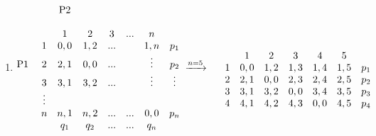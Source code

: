         \begin{enumerate}
            \item \phantom{text}
            \begin{latin}
                \begin{center}
                    \begin{equation*}
                                \begin{matrix}
                                      & & \text{P2}                  \\ \\ 
                                      & & 1 & 2 & 3 & ... & n            \\
                                    & 1 & 0,0 & 1,2 & ... & & 1,n  & p_1         \\
                                    \text{P1} \hspace{1mm}& 2 & 2,1 & 0,0 & ... &  & \vdots & p_2   \\
                                    & 3 & 3,1 & 3,2 & ... & & \vdots & \vdots\\
                                    & \vdots \\
                                    & n & n,1 & n,2 & ... & ... & 0,0  & p_n \\
                                    &  & q_1 & q_2 & ... & ... & q_n 
                                    \end{matrix}
                                    \hspace{1mm}
                                     \xrightarrow{n = 5} 
                                    \hspace{1mm}
                                     \begin{matrix}
                                        & & \text{}                  \\ \\ 
                                        & & 1 & 2 & 3 & 4 & 5            \\
                                      & 1 & 0,0 & 1,2 & 1,3 & 1,4 & 1,5  & p_1         \\
                                      \text{} \hspace{1mm}& 2 & 2,1 & 0,0 & 2,3 & 2,4 & 2,5 & p_2   \\
                                      & 3 & 3,1 & 3,2 & 0,0 & 3,4 & 3,5 & p_3\\
                                      & 4 & 4,1 & 4,2 & 4,3 & 0,0 & 4,5 & p_4\\

\end{matrix}
\end{equation*}
\end{center}
\end{latin}
\end{enumerate}
